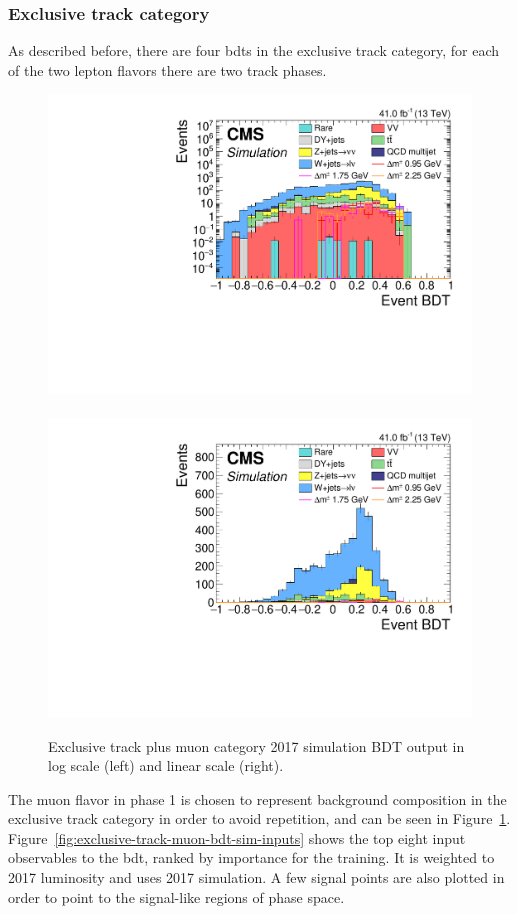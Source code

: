 
\clearpage
\subsubsection{Exclusive track category}

As described before, there are four \glspl{bdt} in the exclusive track category, for each of the two lepton flavors there are two track phases. 

\begin{figure}[!htb]
\centering
\includegraphics[width=0.48\linewidth]{plots/track_muon_bg_signal/none_exTrack_dilepBDTCorrJetNoMultIso10Dr0.6_log.pdf} \,
\includegraphics[width=0.48\linewidth]{plots/track_muon_bg_signal/none_exTrack_dilepBDTCorrJetNoMultIso10Dr0.6.pdf} \\

\caption[Exclusive track plus muon 2017 simulation BDT output]{Exclusive track plus muon category 2017 simulation BDT output in log scale (left) and linear scale (right).}
\label{fig:exclusive-track-bdt-sim-output}
\end{figure}

The muon flavor in phase 1 is chosen to represent background composition in the exclusive track category in order to avoid repetition, and can be seen in Figure~\ref{fig:exclusive-track-bdt-sim-output}. Figure~\ref{fig:exclusive-track-muon-bdt-sim-inputs} shows the top eight input observables to the \gls{bdt}, ranked by importance for the training. It is weighted to 2017 luminosity and uses 2017 simulation. A few signal points are also plotted in order to point to the signal-like regions of phase space.

